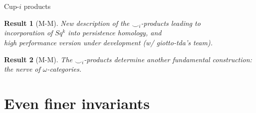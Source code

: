 \documentclass[10pt,t, handout]{beamer} %
\newtheorem{result}{Result}
\begin{document}
\begin{frame}[c]{Cup-$i$ products}
	\pause
	\vskip 10pt

	\begin{result}[M-M]
		New description of the $\smallsmile_i$-products leading to \\
		incorporation of $Sq^k$ into persistence homology, and \\
		high performance version under development (w/ giotto-tda's team).
	\end{result}

	\pause
	\vskip 10pt

	\begin{result}[M-M]
		The $\smallsmile_i$-products determine another fundamental construction: the nerve of $\omega$-categories.
	\end{result}
\end{frame}

\section{Even finer invariants}
\end{document}
